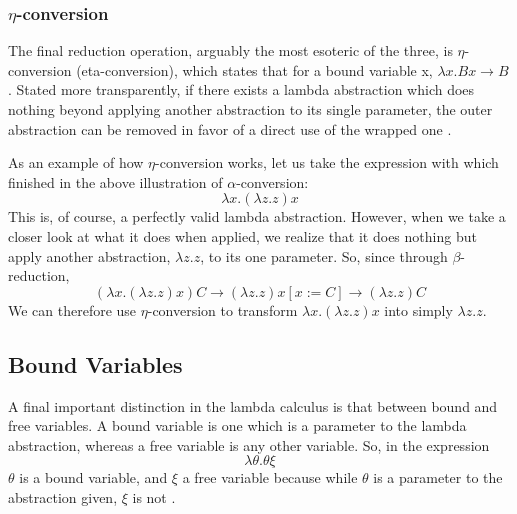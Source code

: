\documentclass[twocolumn,titlepage,12pt]{article}
\begin{document}
\subsubsection{$\eta$-conversion}
The final reduction operation, arguably the most esoteric of the three, is $\eta$-conversion (eta-conversion), which states that for a bound variable x, $\lambda x.Bx \to B$. Stated more transparently, if there exists a lambda abstraction which does nothing beyond applying another abstraction to its single parameter, the outer abstraction can be removed in favor of a direct use of the wrapped one \cite{etared}.

As an example of how $\eta$-conversion works, let us take the expression with which finished in the above illustration of $\alpha$-conversion:
$$\lambda x.(\lambda z.z)x$$
This is, of course, a perfectly valid lambda abstraction. However, when we take a closer look at what it does when applied, we realize that it does nothing but apply another abstraction, $\lambda z.z$, to its one parameter. So, since through $\beta$-reduction,
$$(\lambda x.(\lambda z.z)x)C\to (\lambda z.z)x[x:=C]\to (\lambda z.z)C$$
We can therefore use $\eta$-conversion to transform $\lambda x.(\lambda z.z)x$ into simply $\lambda z.z$.

\subsection{Bound Variables}
A final important distinction in the lambda calculus is that between bound and free variables. A bound variable is one which is a parameter to the lambda abstraction, whereas a free variable is any other variable. So, in the expression
$$\lambda \theta.\theta \xi$$
$\theta$ is a bound variable, and $\xi$ a free variable because while $\theta$ is a parameter to the abstraction given, $\xi$ is not \cite{stanfordlc}.
\end{document}
